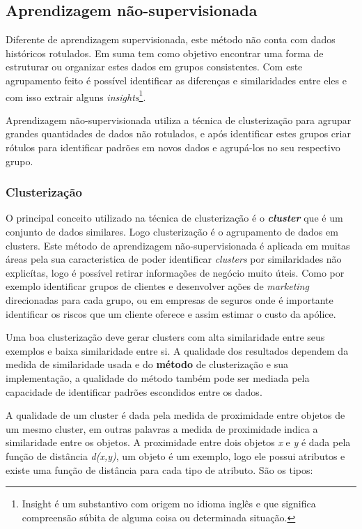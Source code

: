 \subsection{Aprendizagem não-supervisionada}
\label{subsec:unsupervised-learning}

Diferente de aprendizagem supervisionada, este método não conta com dados históricos rotulados. Em suma tem como objetivo encontrar
uma forma de estruturar ou organizar estes dados em grupos consistentes. Com este agrupamento feito é possível identificar 
as diferenças e similaridades entre eles e com isso extrair alguns 
\textit{insights}\footnote{ \cite{insight} Insight é um substantivo com origem no idioma inglês e que significa 
compreensão súbita de alguma coisa ou determinada situação.}.

Aprendizagem não-supervisionada utiliza a técnica de clusterização para agrupar grandes quantidades de dados não rotulados,
e após identificar estes grupos criar rótulos para identificar padrões em novos dados e agrupá-los no seu respectivo
grupo.

\subsubsection{Clusterização}
\label{subsec:clustering}
O principal conceito utilizado na técnica de clusterização é o \textbf{\textit{cluster}} que é um conjunto de dados similares.
Logo clusterização é o agrupamento de dados em clusters. Este método de aprendizagem não-supervisionada é aplicada em muitas áreas
pela sua caracteristica de poder identificar \textit{clusters} por similaridades não explicítas, logo é possível retirar informações
de negócio muito úteis. Como por exemplo identificar grupos de clientes e desenvolver ações de \textit{marketing} direcionadas
para cada grupo, ou em empresas de seguros onde é importante identificar os riscos que um cliente oferece e assim estimar o
custo da apólice.

Uma boa clusterização deve gerar clusters com alta similaridade entre seus exemplos e baixa similaridade entre si. A qualidade 
dos resultados dependem da medida de similaridade usada e do \textbf{método} de clusterização e sua implementação,
a qualidade do método também pode ser mediada pela capacidade de identificar padrões escondidos entre os dados.

A qualidade de um cluster é dada pela medida de proximidade entre objetos de um mesmo cluster, em outras palavras a medida de 
proximidade indica a similaridade entre os objetos. A proximidade entre dois objetos \textit{x} e \textit{y} é dada pela função
de distância \textit{d(x,y)}, um objeto é um exemplo, logo ele possui atributos e existe uma função de 
distância para cada tipo de atributo. São os tipos:

